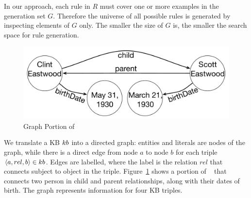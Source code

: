 In our approach, each rule in $R$ must cover one or more examples in the generation set $G$. 
Therefore the universe of all possible rules is generated by inspecting elements of $G$ only. 
The smaller the size of $G$ is, the smaller the search space for rule generation. 


\begin{figure}[t]
	\centering
	\includegraphics[width=0.7\columnwidth]{include/figure/graph_example.pdf}
	\vspace{-2.5ex}
	\caption{Graph Portion of \dbpedia}
	\label{fig:krd_graph_example}
	\vspace{-3ex}
\end{figure}

We translate a KB ${\sc kb}$ into a directed graph: entities and literals are nodes of the graph, while there is a direct edge from node $a$ to node $b$ for each triple $\langle a,rel,b\rangle \in {\sc kb}$. 
Edges are labelled, where the label is the relation $rel$ that connects subject to object in the triple. Figure~\ref{fig:krd_graph_example} shows a portion of \dbpedia~\cite{bizer2009dbpedia} that connects two person in child and parent relationships, along with their dates of birth. The graph represents information for four KB triples.

